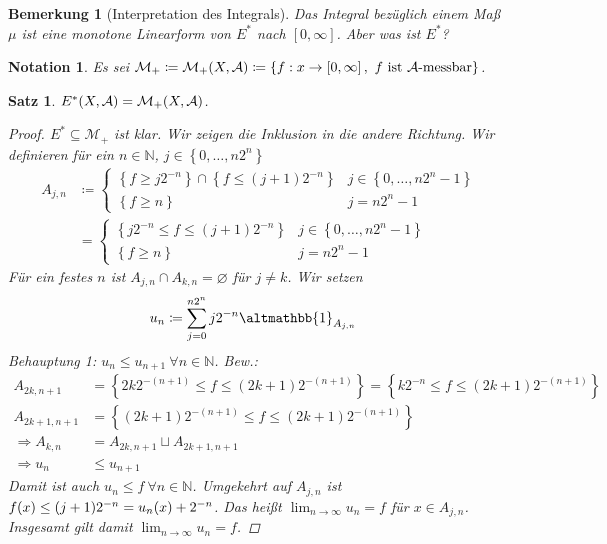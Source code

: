 \documentclass[11pt, twoside, a4paper]{article}
\theoremstyle{plain}
\newtheorem{bemerkung}[blockelement]{Bemerkung}
\newtheorem{satz}[blockelement]{Satz}
\newtheorem{notation}[blockelement]{Notation}
\numberwithin{equation}{subsection}
\newcommand{\set}[1]{\left\{#1\right\}}
\newcommand{\of}[1]{\mathopen{}\mathclose{}\bgroup\left(#1\aftergroup\egroup\right)}
\newcommand{\interv}[1]{\left[#1\right]}
\newcommand{\impl}[0]{\Rightarrow{}}
\renewcommand{\emptyset}{\varnothing}
\newcommand{\charfunc}{\altmathbb{1}}
\newcommand{\toinf}{\to\infty}
\newcommand{\N}{\mathbb{N}}
\newcommand{\mA}{\mathcal{A}}
\newcommand{\mM}{\mathcal{M}}
\begin{document}
    \begin{bemerkung}[Interpretation des Integrals]
        Das Integral bezüglich einem Maß $\mu$ ist eine monotone Linearform von $E^{\ast}$ nach $\interv{0, \infty}$. Aber was ist $E^{\ast}$?
    \end{bemerkung}

    \begin{notation}
        Es sei $\mM_+ \coloneqq \mM_+\of{X, \mA} \coloneqq \set{f: x\to\interv{0, \infty},~f\text{ ist }\mA\text{-messbar}}$.
    \end{notation}

    \begin{satz}
        $E^{\ast}\of{X, \mA} = \mM_+\of{X, \mA}$.

        \begin{proof}
            $E^{\ast} \subseteq \mM_+$ ist klar. Wir zeigen die Inklusion in die andere Richtung. Wir definieren für ein $n\in\N$, $j\in\set{0, \ldots, n2^{n}}$
            \begin{align*}
                A_{j,n} &\coloneqq \begin{cases}
                                       \set{f \geq j2^{-n}} \cap \set{f \leq (j+1)2^{-n}} & j\in\set{0, \ldots, n2^{n}-1}\\
                                       \set{f\geq n} &j = n2^{n}-1
                \end{cases}\\
                &= \begin{cases}
                       \set{j2^{-n} \leq f \leq (j+1)2^{-n}}& j\in\set{0, \ldots, n2^{n}-1}\\
                       \set{f\geq n} &j = n2^{n}-1
                \end{cases}
            \end{align*}
            Für ein festes $n$ ist $A_{j,n} \cap A_{k, n} = \emptyset$ für $j\neq k$. Wir setzen
            \begin{align*}
                u_n &\coloneqq \sum_{j=0}^{n2^n} j2^{-n} \charfunc_{A_{j,n}}
            \end{align*}
            Behauptung 1: $u_n \leq u_{n+1}~\forall n\in\N$. Bew.:
            \begin{align*}
                A_{2k, n+1} &= \set{2k2^{-(n+1)} \leq f \leq (2k+1)2^{-(n+1)}} = \set{k2^{-n} \leq f \leq (2k+1)2^{-(n+1)}}\\
                A_{2k+1, n+1} &= \set{(2k+1)2^{-(n+1)} \leq f \leq (2k+1)2^{-(n+1)}}\\
                \impl A_{k,n} &= A_{2k, n+1} \sqcup A_{2k+1, n+1}\\
                \impl u_{n} &\leq u_{n+1}
            \end{align*}
            Damit ist auch $u_n \leq f~\forall n\in\N$. Umgekehrt auf $A_{j,n}$ ist $f\of{x} \leq (j+1)2^{-n} = u_n\of{x} + 2^{-n}$. Das heißt $\lim_{n\toinf} u_n = f$ für $x\in A_{j,n}$. Insgesamt gilt damit $\lim_{n\toinf}u_n = f$.
        \end{proof}
    \end{satz}
\end{document}
